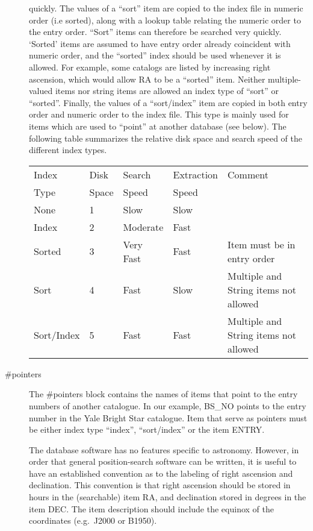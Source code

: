 \begin{description}
quickly.   The values of a ``sort'' item are copied to the index file
in numeric order (i.e sorted), along with a lookup table relating 
the numeric order to the entry order.  ``Sort'' items can therefore be
searched very quickly.  `Sorted' items are assumed to have entry order
already coincident with numeric order, and the ``sorted'' index should be
used whenever it is allowed. For example, some catalogs are
listed by increasing right ascension, which would allow RA to be a
``sorted'' item.  Neither multiple-valued items nor string items are allowed 
an index type of ``sort'' or
``sorted''.  Finally, the values of a ``sort/index'' item are copied in both
entry order and numeric order to the index file.  This type is mainly used
for items which are used to ``point'' at another database (see below).
The following table summarizes the relative disk space and search
speed of the different index types. 
\vspace{0.1in}
\begin{tabular}{|l|l|l|l|l|} \hline
Index  & Disk  & Search & Extraction & Comment \\ 
Type & Space  & Speed & Speed & \\ \hline\hline
None & 1 &  Slow & Slow & \\ \hline
Index & 2 & Moderate & Fast & \\ \hline
Sorted & 3 & Very Fast & Fast & Item must be in entry order \\ \hline 
Sort & 4 & Fast & Slow & Multiple and String items not allowed \\   \hline
Sort/Index & 5 & Fast & Fast & Multiple and String items not allowed \\ \hline
\end{tabular}
\vspace{0.1in}
\item [\#pointers] The \#pointers block contains the names of items
that point to the entry numbers of another catalogue.  In our example,
BS\_NO points to the entry number in the Yale Bright Star catalogue.
Item that serve as pointers must be either index type ``index'',
``sort/index'' or the item ENTRY.

The database software has no features specific to astronomy.    However,
in order that general position-search software can be written, it is useful
to have an established convention as to the labeling of right ascension and
declination.   This convention is that right ascension should be
stored in hours in the (searchable) item RA, and declination stored in
degrees in the item DEC.     The item description should include the 
equinox of the coordinates (e.g.\ J2000 or B1950).
 
\end{description}
